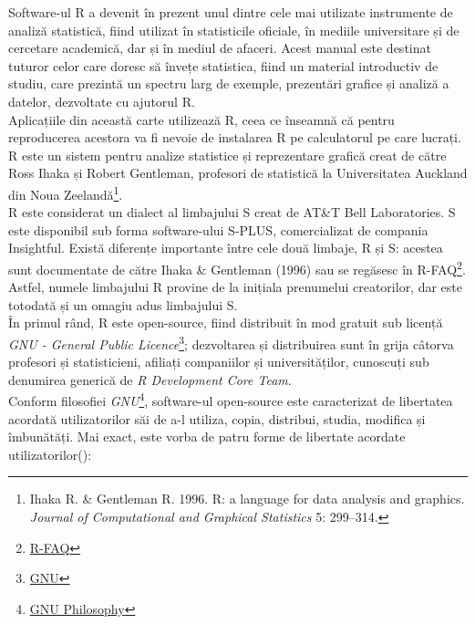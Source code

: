 \documentclass[
  11pt,
  b5paper,
  nottoc]{book}
\begin{document}
Software-ul \textsf{R} a devenit în prezent unul dintre cele mai
utilizate instrumente de analiză statistică, fiind utilizat în
statisticile oficiale, în mediile universitare și de cercetare
academică, dar și în mediul de afaceri. Acest manual este destinat
tuturor celor care doresc să învețe statistica, fiind un material
introductiv de studiu, care prezintă un spectru larg de exemple,
prezentări grafice și analiză a datelor, dezvoltate cu ajutorul
\textsf{R}.\\
Aplicațiile din această carte utilizează \textsf{R}, ceea ce înseamnă că
pentru reproducerea acestora va fi nevoie de instalarea \textsf{R} pe
calculatorul pe care lucrați.\\
\textsf{R} este un sistem pentru analize statistice și reprezentare
grafică creat de către Ross Ihaka și Robert Gentleman, profesori de
statistică la Universitatea Auckland din Noua
Zeelandă\footnote{Ihaka R. \& Gentleman R. 1996. R: a language for data analysis and graphics. {\it Journal of Computational and Graphical Statistics} 5: 299--314.}.\\
\textsf{R} este considerat un dialect al limbajului
\textsf{S} creat de AT\&T Bell Laboratories. \textsf{S} este disponibil
sub forma software-ului S-PLUS, comercializat de compania Insightful.
Există diferențe importante între cele două limbaje, \textsf{R} și
\textsf{S}: acestea sunt documentate de către Ihaka \& Gentleman (1996)
sau se regăsesc în
R-FAQ\footnote{\href{http://cran.r-project.org/doc/FAQ/R-FAQ.html\#What-are-the-differences-between-R-and-S_003f}{R-FAQ}}.\\
Astfel, numele limbajului R provine de la inițiala prenumelui
creatorilor, dar este totodată și un omagiu adus limbajului
\textsf{S}.\\
În primul rând, \textsf{R} este open-source, fiind distribuit în mod
gratuit sub licență
\textit{GNU - General Public Licence}\footnote{\href{http://www.gnu.org/}{GNU}};
dezvoltarea și distribuirea sunt în grija câtorva profesori și
statisticieni, afiliați companiilor și universităților, cunoscuți sub
denumirea generică de \textit{R Development Core Team}.\\
Conform filosofiei
\textit{GNU}\footnote{\href{http://www.gnu.org/philosophy/free-sw.ro.html\#exportcontrol}{GNU Philosophy}},
software-ul open-source este caracterizat de libertatea acordată
utilizatorilor săi de a-l utiliza, copia, distribui, studia, modifica și
îmbunătăți. Mai exact, este vorba de patru forme de libertate acordate
utilizatorilor():
\end{document}
